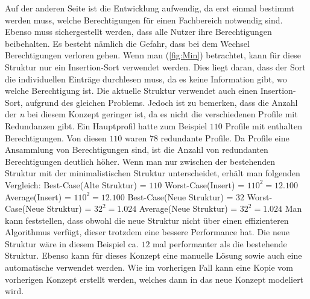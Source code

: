 Auf der anderen Seite ist die Entwicklung aufwendig, da erst einmal bestimmt werden muss, welche Berechtigungen für einen Fachbereich notwendig sind.
Ebenso muss sichergestellt werden, dass alle Nutzer ihre Berechtigungen beibehalten.
Es besteht nämlich die Gefahr, dass bei dem Wechsel Berechtigungen verloren gehen.
\newline
\newline
Wenn man (\ref{fig:Min}) betrachtet, kann für diese Struktur nur ein Insertion-Sort verwendet werden.
Dies liegt daran, dass der Sort die individuellen Einträge durchlesen muss, da es keine Information gibt, wo welche Berechtigung ist.
Die aktuelle Struktur verwendet auch einen Insertion-Sort, aufgrund des gleichen Problems.
Jedoch ist zu bemerken, dass die Anzahl der \textit{n} bei diesem Konzept geringer ist, da es nicht die verschiedenen Profile mit Redundanzen gibt.
\newline
\newline
Ein Hauptprofil hatte zum Beispiel $110$ Profile mit enthalten Berechtigungen.
Von diesen $110$ waren $78$ redundante Profile.
Da Profile eine Ansammlung von Berechtigungen sind, ist die Anzahl von redundanten Berechtigungen deutlich höher.
Wenn man nur zwischen der bestehenden Struktur mit der minimalistischen Struktur unterscheidet, erhält man folgenden Vergleich:
\newline
\newline
Best-Case(Alte Struktur) = $110$
\newline
Worst-Case(Insert) = $110^2 = 12.100$
\newline
Average(Insert) = $110^2 = 12.100$
\newline
\newline
Best-Case(Neue Struktur) = $32$
\newline
Worst-Case(Neue Struktur) = $32^2 = 1.024$
\newline
Average(Neue Struktur) = $32^2 = 1.024$
\newline
\newline
Man kann feststellen, dass obwohl die neue Struktur nicht über einen effizienteren Algorithmus verfügt, dieser trotzdem eine bessere Performance hat.
Die neue Struktur wäre in diesem Beispiel ca. $12$ mal performanter als die bestehende Struktur.
\newline
\newline
Ebenso kann für dieses Konzept eine manuelle Lösung sowie auch eine automatische verwendet werden.
Wie im vorherigen Fall kann eine Kopie vom vorherigen Konzept erstellt werden, welches dann in das neue Konzept modeliert wird.

